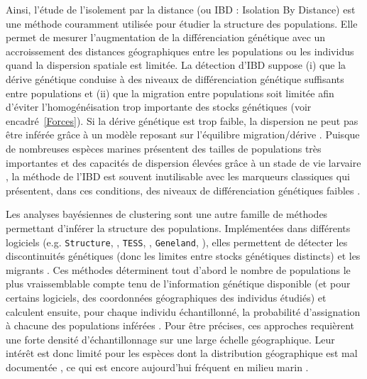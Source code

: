 \documentclass[a4paper,12pt,twoside]{article}\usepackage[]{graphicx}\usepackage[]{color}
\begin{document}
Ainsi, l'étude de l'isolement par la distance (ou IBD : Isolation By Distance) est une méthode couramment utilisée pour étudier la structure des populations. Elle permet de mesurer l'augmentation de la différenciation génétique avec un accroissement des distances géographiques entre les populations \citep{rousset1997genetic} ou les individus \citep{rousset2000genetic} quand la dispersion spatiale est limitée. La détection d'IBD suppose (i) que la dérive génétique conduise à des niveaux de différenciation génétique suffisants entre populations et (ii) que la migration entre populations soit limitée afin d'éviter l'homogénéisation trop importante des stocks génétiques (voir encadré~\ref{Forces}). Si la dérive génétique est trop faible, la dispersion ne peut pas être inférée grâce à un modèle reposant sur l'équilibre migration/dérive \citep{gagnaire2015aa}. Puisque de nombreuses espèces marines présentent des tailles de populations très importantes et des capacités de dispersion élevées grâce à un stade de vie larvaire \citep[e.g. chez les poissons et invertébrés][]{dewoody2000microsatellite, mccusker2010positive}, la méthode de l'IBD est souvent inutilisable avec les marqueurs classiques qui présentent, dans ces conditions, des niveaux de différenciation génétiques faibles \citep{selkoe2011marine}.

Les analyses bayésiennes de clustering sont une autre famille de méthodes permettant d'inférer la structure des populations. Implémentées dans différents logiciels (e.g. \texttt{Structure}, \citet{pritchard2000inference}, \texttt{TESS}, \citet{franccois2010spatially}, \texttt{Geneland}, \citet{guillot2012}), elles permettent de détecter les discontinuités génétiques (donc les limites entre stocks génétiques distincts) et les migrants \citep{broquet2009molecular}. Ces méthodes déterminent tout d'abord le nombre de populations le plus vraissemblable compte tenu de l'information génétique disponible (et pour certains logiciels, des coordonnées géographiques des individus étudiés) et calculent ensuite, pour chaque individu échantillonné, la probabilité d'assignation à chacune des populations inférées \citep{pritchard2000inference, corander2003bayesian}. Pour être précises, ces approches requièrent une forte densité d'échantillonnage sur une large échelle géographique. Leur intérêt est donc limité pour les espèces dont la distribution géographique est mal documentée \citep{gagnaire2015aa}, ce qui est encore aujourd'hui fréquent en milieu marin \citep{novak2016predictive}.
\end{document}
